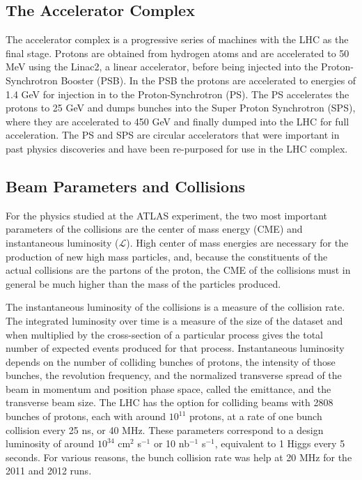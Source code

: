 \subsection{The Accelerator Complex}

The accelerator complex is a progressive series of machines with the LHC as the final stage.
Protons are obtained from hydrogen atoms and are accelerated to 50 MeV using the
Linac2, a linear accelerator, before being injected into the Proton-Synchrotron Booster (PSB). In
the PSB the protons are accelerated to energies of 1.4 GeV for injection
in to the Proton-Synchrotron (PS). The PS accelerates the protons to 25 GeV
and dumps bunches into the Super Proton Synchrotron (SPS), where they 
are accelerated to 450 GeV and finally dumped into the LHC for full acceleration. The PS and SPS are circular accelerators
that were important in past physics discoveries and have been re-purposed for use in the LHC complex. 

\subsection{Beam Parameters and Collisions} 

For the physics studied at the ATLAS experiment, the two most important parameters of
the collisions are the center of mass energy (CME)  and instantaneous luminosity ($\mathcal{L}$).
High center of mass energies are necessary for the production
of new high mass particles, and, because the constituents of the actual collisions
are the partons of the proton, the CME of the collisions must in general
be much higher than the mass of the particles produced. 

The instantaneous luminosity of the collisions is a measure of the
collision rate. The integrated luminosity over time is a measure of the size
of the dataset and when multiplied by the cross-section of a particular process
gives the total number of expected events produced for that process.
Instantaneous luminosity depends on the number of colliding bunches of protons,
the intensity of those bunches, the revolution
frequency, and the normalized transverse spread of the beam in momentum and position
phase space, called the emittance, and the transverse beam size. The LHC has the
option for colliding beams with 2808 bunches of protons, each with around $10^{11}$ protons,
at a rate of one bunch collision every 25 ns, or 40 MHz. These parameters correspond
to a design luminosity of around $10^{34}$ cm$^{2}$ s$^{-1}$ or 10 nb$^{-1}$ s$^{-1}$,
equivalent to 1 Higgs every 5 seconds. For various reasons, the bunch collision
rate was help at 20 MHz for the 2011 and 2012 runs. 

